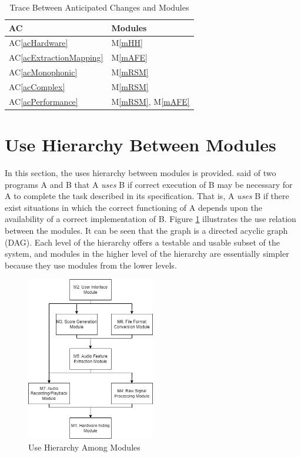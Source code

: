 \documentclass[12pt, titlepage]{article}
\newcommand{\acref}[1]{AC\ref{#1}}
\newcommand{\mref}[1]{M\ref{#1}}
\begin{document}
\begin{table}[H]
\centering
\begin{tabular}{p{} p{}}
\toprule
\textbf{AC} & \textbf{Modules}\\
\midrule
\acref{acHardware} & \mref{mHH}\\
\acref{acExtractionMapping} & \mref{mAFE}\\
\acref{acMonophonic} & \mref{mRSM}\\
\acref{acComplex} & \mref{mRSM}\\
\acref{acPerformance} & \mref{mRSM}, \mref{mAFE}\\
\bottomrule
\end{tabular}
\caption{Trace Between Anticipated Changes and Modules}
\label{TblACT}
\end{table}

\section{Use Hierarchy Between Modules} \label{SecUse}

In this section, the uses hierarchy between modules is
provided. \citet{Parnas1978} said of two programs A and B that A {\em uses} B if
correct execution of B may be necessary for A to complete the task described in
its specification. That is, A {\em uses} B if there exist situations in which
the correct functioning of A depends upon the availability of a correct
implementation of B.  Figure \ref{FigUH} illustrates the use relation between
the modules. It can be seen that the graph is a directed acyclic graph
(DAG). Each level of the hierarchy offers a testable and usable subset of the
system, and modules in the higher level of the hierarchy are essentially simpler
because they use modules from the lower levels.

\begin{figure}[H]
\centering
\includegraphics[width=0.5\textwidth]{./images/ModuleGuideUseHierarchy.jpg}
\caption{Use Hierarchy Among Modules}
\label{FigUH}
\end{figure}
\end{document}
